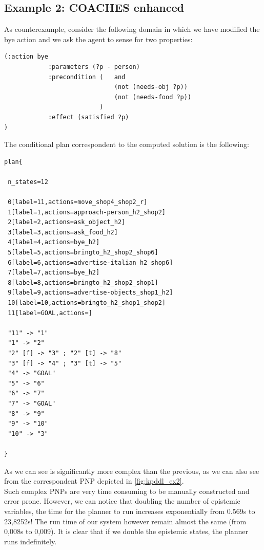 \documentclass[pdftex,12pt,a4paper]{report}
\begin{document}
\subsection{Example 2: COACHES enhanced}
As counterexample, consider the following domain in which we have modified the bye action and we ask the agent to sense for two properties:
\begin{verbatim}
(:action bye
            :parameters (?p - person)
            :precondition (   and
                              (not (needs-obj ?p))
                              (not (needs-food ?p))
                          )
            :effect (satisfied ?p)
)
\end{verbatim}
\noindent The conditional plan correspondent to the computed solution is the following:
\begin{verbatim}
plan{ 

 n_states=12

 0[label=11,actions=move_shop4_shop2_r]
 1[label=1,actions=approach-person_h2_shop2]
 2[label=2,actions=ask_object_h2]
 3[label=3,actions=ask_food_h2]
 4[label=4,actions=bye_h2]
 5[label=5,actions=bringto_h2_shop2_shop6]
 6[label=6,actions=advertise-italian_h2_shop6]
 7[label=7,actions=bye_h2]
 8[label=8,actions=bringto_h2_shop2_shop1]
 9[label=9,actions=advertise-objects_shop1_h2]
 10[label=10,actions=bringto_h2_shop1_shop2]
 11[label=GOAL,actions=]

 "11" -> "1"
 "1" -> "2"
 "2" [f] -> "3" ; "2" [t] -> "8"
 "3" [f] -> "4" ; "3" [t] -> "5"
 "4" -> "GOAL"
 "5" -> "6"
 "6" -> "7"
 "7" -> "GOAL"
 "8" -> "9"
 "9" -> "10"
 "10" -> "3"

}
\end{verbatim}
As we can see is significantly more complex than the previous, as we can also see from the correspondent PNP depicted in \ref{fig:kpddl_ex2}.\\
Such complex PNPs are very time consuming to be manually constructed and error prone. However, we can notice that doubling the number of epistemic variables, the time for the planner to run increases exponentially from 0.569s to 23,8252s! The run time of our system however remain almost the same (from 0,008s to 0,009).
It is clear that if we double the epistemic states, the planner runs indefinitely.
\end{document}
